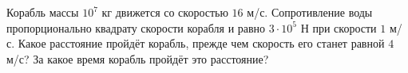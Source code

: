 Корабль массы $10^7$ кг движется со скоростью $16$ м/с.
Сопротивление воды пропорционально квадрату скорости корабля и равно
$3\cdot10^5$ Н при скорости $1$ м/с. Какое расстояние пройдёт корабль,
прежде чем скорость его станет равной $4$ м/с? За какое время корабль
пройдёт это расстояние?
